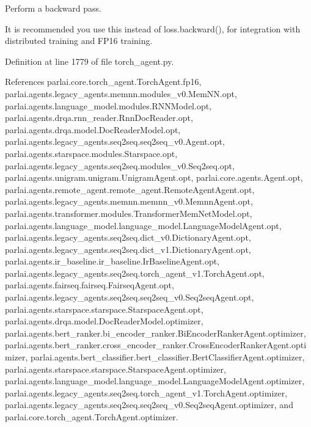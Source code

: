 \begin{DoxyVerb}Perform a backward pass.

It is recommended you use this instead of
loss.backward(), for integration with distributed training and FP16
training.
\end{DoxyVerb}
 

Definition at line 1779 of file torch\+\_\+agent.\+py.



References parlai.\+core.\+torch\+\_\+agent.\+Torch\+Agent.\+fp16, parlai.\+agents.\+legacy\+\_\+agents.\+memnn.\+modules\+\_\+v0.\+Mem\+N\+N.\+opt, parlai.\+agents.\+language\+\_\+model.\+modules.\+R\+N\+N\+Model.\+opt, parlai.\+agents.\+drqa.\+rnn\+\_\+reader.\+Rnn\+Doc\+Reader.\+opt, parlai.\+agents.\+drqa.\+model.\+Doc\+Reader\+Model.\+opt, parlai.\+agents.\+legacy\+\_\+agents.\+seq2seq.\+seq2seq\+\_\+v0.\+Agent.\+opt, parlai.\+agents.\+starspace.\+modules.\+Starspace.\+opt, parlai.\+agents.\+legacy\+\_\+agents.\+seq2seq.\+modules\+\_\+v0.\+Seq2seq.\+opt, parlai.\+agents.\+unigram.\+unigram.\+Unigram\+Agent.\+opt, parlai.\+core.\+agents.\+Agent.\+opt, parlai.\+agents.\+remote\+\_\+agent.\+remote\+\_\+agent.\+Remote\+Agent\+Agent.\+opt, parlai.\+agents.\+legacy\+\_\+agents.\+memnn.\+memnn\+\_\+v0.\+Memnn\+Agent.\+opt, parlai.\+agents.\+transformer.\+modules.\+Transformer\+Mem\+Net\+Model.\+opt, parlai.\+agents.\+language\+\_\+model.\+language\+\_\+model.\+Language\+Model\+Agent.\+opt, parlai.\+agents.\+legacy\+\_\+agents.\+seq2seq.\+dict\+\_\+v0.\+Dictionary\+Agent.\+opt, parlai.\+agents.\+legacy\+\_\+agents.\+seq2seq.\+dict\+\_\+v1.\+Dictionary\+Agent.\+opt, parlai.\+agents.\+ir\+\_\+baseline.\+ir\+\_\+baseline.\+Ir\+Baseline\+Agent.\+opt, parlai.\+agents.\+legacy\+\_\+agents.\+seq2seq.\+torch\+\_\+agent\+\_\+v1.\+Torch\+Agent.\+opt, parlai.\+agents.\+fairseq.\+fairseq.\+Fairseq\+Agent.\+opt, parlai.\+agents.\+legacy\+\_\+agents.\+seq2seq.\+seq2seq\+\_\+v0.\+Seq2seq\+Agent.\+opt, parlai.\+agents.\+starspace.\+starspace.\+Starspace\+Agent.\+opt, parlai.\+agents.\+drqa.\+model.\+Doc\+Reader\+Model.\+optimizer, parlai.\+agents.\+bert\+\_\+ranker.\+bi\+\_\+encoder\+\_\+ranker.\+Bi\+Encoder\+Ranker\+Agent.\+optimizer, parlai.\+agents.\+bert\+\_\+ranker.\+cross\+\_\+encoder\+\_\+ranker.\+Cross\+Encoder\+Ranker\+Agent.\+optimizer, parlai.\+agents.\+bert\+\_\+classifier.\+bert\+\_\+classifier.\+Bert\+Classifier\+Agent.\+optimizer, parlai.\+agents.\+starspace.\+starspace.\+Starspace\+Agent.\+optimizer, parlai.\+agents.\+language\+\_\+model.\+language\+\_\+model.\+Language\+Model\+Agent.\+optimizer, parlai.\+agents.\+legacy\+\_\+agents.\+seq2seq.\+torch\+\_\+agent\+\_\+v1.\+Torch\+Agent.\+optimizer, parlai.\+agents.\+legacy\+\_\+agents.\+seq2seq.\+seq2seq\+\_\+v0.\+Seq2seq\+Agent.\+optimizer, and parlai.\+core.\+torch\+\_\+agent.\+Torch\+Agent.\+optimizer.



